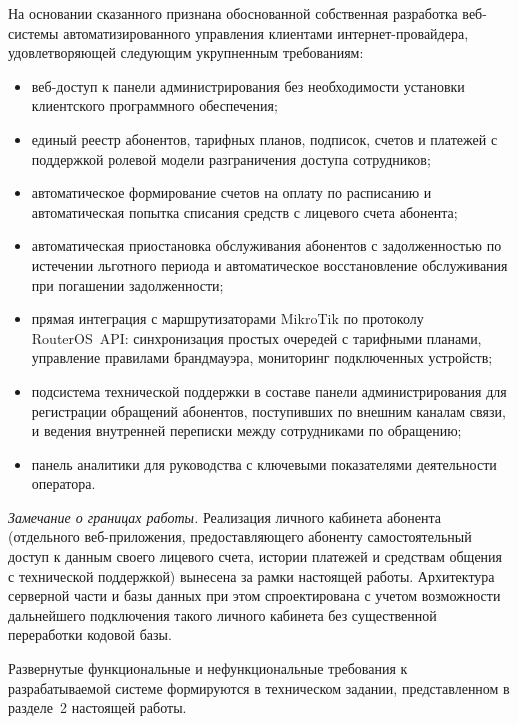 На основании сказанного признана обоснованной собственная разработка веб-системы автоматизированного управления клиентами интернет-провайдера, удовлетворяющей следующим укрупненным требованиям:
\begin{itemize}
\item веб-доступ к панели администрирования без необходимости установки клиентского программного обеспечения;
\item единый реестр абонентов, тарифных планов, подписок, счетов и платежей с поддержкой ролевой модели разграничения доступа сотрудников;
\item автоматическое формирование счетов на оплату по расписанию и автоматическая попытка списания средств с лицевого счета абонента;
\item автоматическая приостановка обслуживания абонентов с задолженностью по истечении льготного периода и автоматическое восстановление обслуживания при погашении задолженности;
\item прямая интеграция с маршрутизаторами MikroTik по протоколу RouterOS~API: синхронизация простых очередей с тарифными планами, управление правилами брандмауэра, мониторинг подключенных устройств;
\item подсистема технической поддержки в составе панели администрирования для регистрации обращений абонентов, поступивших по внешним каналам связи, и ведения внутренней переписки между сотрудниками по обращению;
\item панель аналитики для руководства с ключевыми показателями деятельности оператора.
\end{itemize}

\emph{Замечание о границах работы.} Реализация личного кабинета абонента (отдельного веб-приложения, предоставляющего абоненту самостоятельный доступ к данным своего лицевого счета, истории платежей и средствам общения с технической поддержкой) вынесена за рамки настоящей работы. Архитектура серверной части и базы данных при этом спроектирована с учетом возможности дальнейшего подключения такого личного кабинета без существенной переработки кодовой базы.

Развернутые функциональные и нефункциональные требования к разрабатываемой системе формируются в техническом задании, представленном в разделе~2 настоящей работы.
